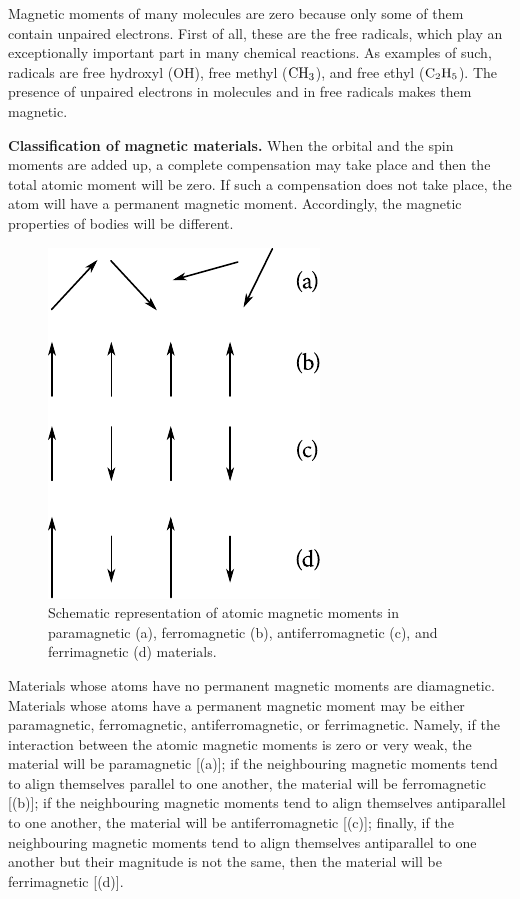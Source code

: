 Magnetic moments of many molecules are zero because only some of them contain unpaired electrons. First of all, these are the free radicals, which play an exceptionally important part in many chemical reactions. As examples of such, radicals are free hydroxyl (OH), free methyl ($\ce{CH3}$), and free ethyl ($\ce{C2H5}$). The presence of unpaired electrons in molecules and in free radicals makes them magnetic.

\textbf{Classification of magnetic materials.} When the orbital and the spin moments are added up, a complete compensation may take place and then the total atomic moment will be zero. If such a compensation does not take place, the atom will have a permanent magnetic moment. Accordingly, the magnetic properties of bodies will be different.

\begin{figure}[t]
	\begin{center}
		\includegraphics[scale=1]{figures/ch_07/fig_7_10.pdf}
		\caption[]{Schematic representation of atomic magnetic moments in paramagnetic (a), ferromagnetic (b), antiferromagnetic (c), and ferrimagnetic (d) materials.}
		\label{fig:7_10}
	\end{center}
	\vspace{-0.7cm}
\end{figure}

Materials whose atoms have no permanent magnetic moments are diamagnetic. Materials whose atoms have a permanent magnetic moment may be either paramagnetic, ferromagnetic, antiferromagnetic,
or ferrimagnetic. Namely, if the interaction between the atomic magnetic moments is zero or very weak, the material will be paramagnetic [(a)]; if the neighbouring magnetic moments tend to align themselves parallel to one another, the material will
be ferromagnetic [(b)]; if the neighbouring magnetic moments tend to align themselves antiparallel to one another, the material will be antiferromagnetic [(c)]; finally, if the neighbouring magnetic moments tend to align themselves antiparallel to one another but their magnitude is not the same, then the material will be ferrimagnetic [(d)].

